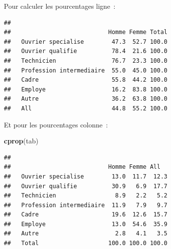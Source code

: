 \documentclass[
  12pt,
]{book}
\newenvironment{Shaded}{\begin{snugshade}}{\end{snugshade}}
\newcommand{\KeywordTok}[1]{\textcolor[rgb]{0.13,0.29,0.53}{\textbf{#1}}}
\newcommand{\NormalTok}[1]{#1}
\newcommand{\OperatorTok}[1]{\textcolor[rgb]{0.81,0.36,0.00}{\textbf{#1}}}
\newcommand{\StringTok}[1]{\textcolor[rgb]{0.31,0.60,0.02}{#1}}
\begin{document}
Pour calculer les pourcentages ligne~:

\begin{Shaded}
\end{Shaded}

\begin{verbatim}
##                           
##                            Homme Femme Total
##   Ouvrier specialise        47.3  52.7 100.0
##   Ouvrier qualifie          78.4  21.6 100.0
##   Technicien                76.7  23.3 100.0
##   Profession intermediaire  55.0  45.0 100.0
##   Cadre                     55.8  44.2 100.0
##   Employe                   16.2  83.8 100.0
##   Autre                     36.2  63.8 100.0
##   All                       44.8  55.2 100.0
\end{verbatim}

Et pour les pourcentages colonne~:

\begin{Shaded}
\begin{Highlighting}[]
\KeywordTok{cprop}\NormalTok{(tab)}
\end{Highlighting}
\end{Shaded}

\begin{verbatim}
##                           
##                            Homme Femme All  
##   Ouvrier specialise        13.0  11.7  12.3
##   Ouvrier qualifie          30.9   6.9  17.7
##   Technicien                 8.9   2.2   5.2
##   Profession intermediaire  11.9   7.9   9.7
##   Cadre                     19.6  12.6  15.7
##   Employe                   13.0  54.6  35.9
##   Autre                      2.8   4.1   3.5
##   Total                    100.0 100.0 100.0
\end{verbatim}
\end{document}
